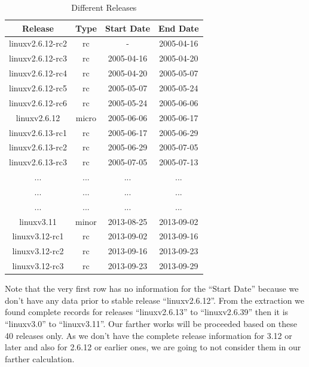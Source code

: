 \documentclass{acm_proc_article-sp}
\begin{document}
\begin{table}[ht]
\caption{Different Releases}  %
\centering 						%
\begin{tabular}{c c c c}				%
\hline\hline						%
Release & Type & Start Date & End Date \\ [0.5ex]
\hline 							%
linuxv2.6.12-rc2 & rc       & - & 2005-04-16 \\
linuxv2.6.12-rc3 & rc       & 2005-04-16 & 2005-04-20 \\
linuxv2.6.12-rc4 & rc       & 2005-04-20 & 2005-05-07 \\
linuxv2.6.12-rc5 & rc       & 2005-05-07 & 2005-05-24 \\
linuxv2.6.12-rc6 & rc       & 2005-05-24 & 2005-06-06 \\
linuxv2.6.12        & micro & 2005-06-06 & 2005-06-17 \\
linuxv2.6.13-rc1 & rc       & 2005-06-17 & 2005-06-29 \\
linuxv2.6.13-rc2 & rc       & 2005-06-29 & 2005-07-05 \\
linuxv2.6.13-rc3 & rc       & 2005-07-05 & 2005-07-13 \\
...			     & ...	   & ... 		     & ...\\
...			     & ...	   & ... 		     & ... \\
...			     & ...	   & ... 		     & ... \\
linuxv3.11            & minor & 2013-08-25 & 2013-09-02 \\
linuxv3.12-rc1     & rc       & 2013-09-02 & 2013-09-16 \\
linuxv3.12-rc2     & rc       & 2013-09-16 & 2013-09-23 \\
linuxv3.12-rc3     & rc       & 2013-09-23 & 2013-09-29 \\
[1ex]							%
\hline 							%
\end{tabular}
\label{table:nonlin} 				%
\end{table}

Note that the very first row has no information for the ``Start Date'' because we don't have any data prior to stable release ``linuxv2.6.12''. From the extraction we found complete records for releases ``linuxv2.6.13'' to ``linuxv2.6.39'' then it is ``linuxv3.0'' to ``linuxv3.11''. Our farther works will be proceeded based on these 40 releases only. As we don't have the complete release information for 3.12 or later and also for 2.6.12 or earlier ones, we are going to not consider them in our farther calculation.
\end{document}

